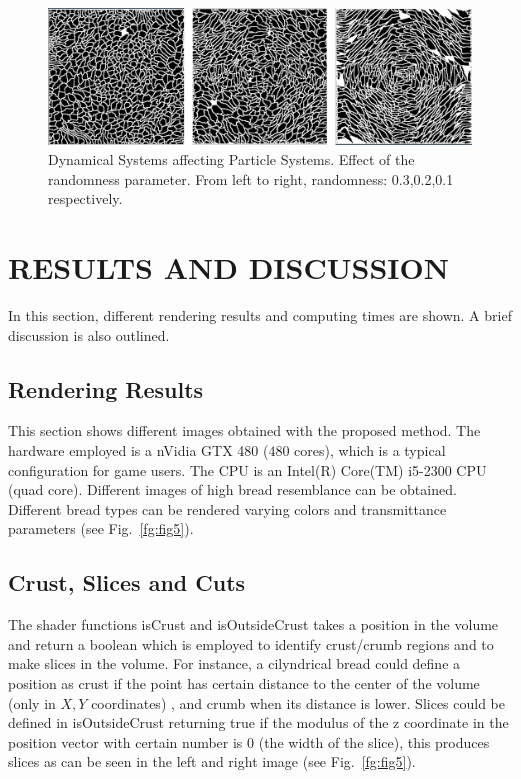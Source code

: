 \documentclass[oneside,a4paper,english,links]{amca}
\begin{document}
\begin{figure}[htb!]
  \centerline{\includegraphics[scale=0.21]{fig4}}
  \caption{Dynamical Systems affecting Particle Systems. Effect of the randomness parameter. From left to right, randomness: 0.3,0.2,0.1 respectively. }
  \label{fg:fig4}
\end{figure}



\section{RESULTS AND DISCUSSION}

In this section, different rendering results and computing times are shown. A brief discussion is also outlined.

\subsection{Rendering Results}

This section shows different images obtained with the proposed method. The hardware employed is a nVidia GTX 480 ($480$ cores), which is a typical configuration for game users. The CPU is an Intel(R) Core(TM) i5-2300 CPU (quad core). Different images of high bread resemblance can be obtained. Different bread types can be rendered varying colors and transmittance parameters (see Fig.~\ref{fg:fig5}). 

\subsection{Crust, Slices and Cuts}
The shader functions isCrust and isOutsideCrust takes a position in the volume and return a boolean which is employed to identify crust/crumb regions and to make slices in the volume. For instance, a cilyndrical bread could define a position as crust if the point has certain distance to the center of the volume (only in $X,Y$ coordinates) , and crumb when its distance is lower. Slices could be defined in isOutsideCrust returning true if the modulus of the z coordinate in the position vector with certain number is $0$ (the width of the slice), this produces slices as can be seen in the left and right image (see Fig.~\ref{fg:fig5}).
\end{document}
